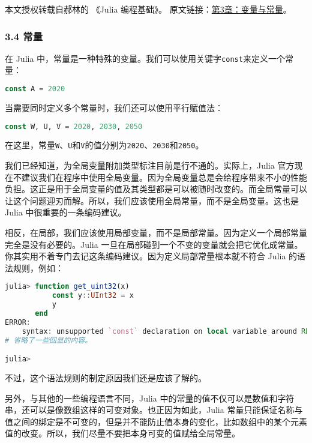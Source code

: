 
本文授权转载自郝林的 《Julia 编程基础》。 原文链接：\href{https://github.com/hyper0x/JuliaBasics/blob/master/book/ch03.md}{第3章：变量与常量}。


\subsubsection{3.4 常量}

在 Julia 中，常量是一种特殊的变量。我们可以使用关键字\verb|const|来定义一个常量：

\begin{lstlisting}[language=julia]
const A = 2020
\end{lstlisting}

当需要同时定义多个常量时，我们还可以使用平行赋值法：

\begin{lstlisting}[language=julia]
const W, U, V = 2020, 2030, 2050
\end{lstlisting}

在这里，常量\verb|W|、\verb|U|和\verb|V|的值分别为\verb|2020|、\verb|2030|和\verb|2050|。

我们已经知道，为全局变量附加类型标注目前是行不通的。实际上，Julia 官方现在不建议我们在程序中使用全局变量。因为全局变量总是会给程序带来不小的性能负担。这正是用于全局变量的值及其类型都是可以被随时改变的。而全局常量可以让这个问题迎刃而解。所以，我们应该使用全局常量，而不是全局变量。这也是 Julia 中很重要的一条编码建议。

相反，在局部，我们应该使用局部变量，而不是局部常量。因为定义一个局部常量完全是没有必要的。Julia 一旦在局部碰到一个不变的变量就会把它优化成常量。你其实用不着专门去记这条编码建议。因为定义局部常量根本就不符合 Julia 的语法规则，例如：

\begin{lstlisting}[language=julia]
julia> function get_uint32(x)
           const y::UInt32 = x
           y
       end
ERROR: 
    syntax: unsupported `const` declaration on local variable around REPL[1]:2
# 省略了一些回显的内容。

julia> 
\end{lstlisting}

不过，这个语法规则的制定原因我们还是应该了解的。

另外，与其他的一些编程语言不同，Julia 中的常量的值不仅可以是数值和字符串，还可以是像数组这样的可变对象。也正因为如此，Julia 常量只能保证名称与值之间的绑定是不可变的，但是并不能防止值本身的变化，比如数组中的某个元素值的改变。所以，我们尽量不要把本身可变的值赋给全局常量。

